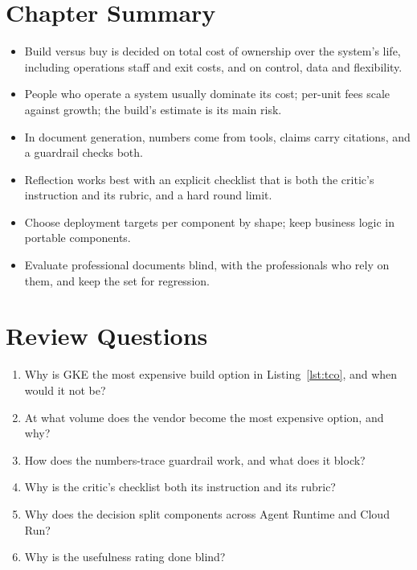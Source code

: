 \section*{Chapter Summary}

\begin{itemize}[itemsep=2pt]
  \item Build versus buy is decided on total cost of ownership over the system's life, including operations staff and exit costs, and on control, data and flexibility.
  \item People who operate a system usually dominate its cost; per-unit fees scale against growth; the build's estimate is its main risk.
  \item In document generation, numbers come from tools, claims carry citations, and a guardrail checks both.
  \item Reflection works best with an explicit checklist that is both the critic's instruction and its rubric, and a hard round limit.
  \item Choose deployment targets per component by shape; keep business logic in portable components.
  \item Evaluate professional documents blind, with the professionals who rely on them, and keep the set for regression.
\end{itemize}

\section*{Review Questions}

\begin{enumerate}[itemsep=2pt]
  \item Why is GKE the most expensive build option in Listing~\ref{lst:tco}, and when would it not be?
  \item At what volume does the vendor become the most expensive option, and why?
  \item How does the numbers-trace guardrail work, and what does it block?
  \item Why is the critic's checklist both its instruction and its rubric?
  \item Why does the decision split components across Agent Runtime and Cloud Run?
  \item Why is the usefulness rating done blind?
\end{enumerate}

